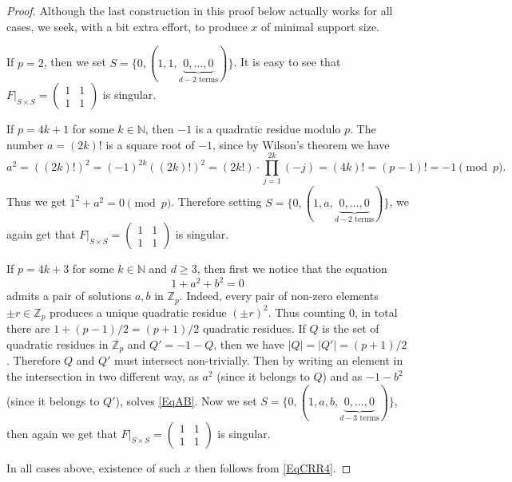 \documentclass[A4,11pt]{article}
\newcommand{\eval}[2]{\left.#1\right|_{#2}}
\begin{document}
\begin{proof}
Although the last construction in this proof below actually works for all cases, we seek, with a bit extra effort, to produce $x$ of minimal support size.

If $p=2$, then we set $S=\{0,(1,1,\underbrace{0,\ldots,0}_{d-2 \text{ terms}})\}$. It is easy to see that $\eval{F}{S\times S}=\begin{pmatrix} 1 & 1 \\ 1 & 1 \end{pmatrix}$ is singular.

If $p=4k+1$ for some $k\in\mathbb N$, then $-1$ is a quadratic residue modulo $p$. The number $a=(2k)!$ is a square root of $-1$, since by Wilson's theorem we have 
$$a^2=\left((2k)!\right)^2=(-1)^{2k}((2k)!)^2=(2k!)\cdot\prod_{j=1}^{2k}(-j)=(4k)!=(p-1)!=-1 \pmod p.$$
Thus we get $1^2+a^2=0\pmod p$. Therefore setting $S=\{0,(1,a,\underbrace{0,\ldots,0}_{d-2 \text{ terms}})\}$, we again get that $\eval{F}{S\times S}=\begin{pmatrix} 1 & 1 \\ 1 & 1 \end{pmatrix}$ is singular. 

If $p=4k+3$ for some $k\in\mathbb N$ and $d\ge 3$, then first we notice that the equation 
\begin{equation} \label{EqAB}
1+a^2+b^2=0
\end{equation} 
admits a pair of solutions $a,b$ in $\mathbb Z_p$. Indeed, every pair of non-zero elements $\pm r\in\mathbb Z_p$ produces a unique quadratic residue $(\pm r)^2$. Thus counting $0$, in total there are $1+(p-1)/2=(p+1)/2$ quadratic residues. If $Q$ is the set of quadratic residues in $\mathbb Z_p$ and $Q'=-1-Q$, then we have $|Q|=|Q'|=(p+1)/2$. Therefore $Q$ and $Q'$ must intersect non-trivially. Then by writing an element in the intersection in two different way, as $a^2$ (since it belongs to $Q$) and as $-1-b^2$ (since it belongs to $Q'$), solves \eqref{EqAB}. Now we set $S=\{0,(1,a,b,\underbrace{0,\ldots,0}_{d-3 \text{ terms}})\}$, then again we get that $\eval{F}{S\times S}=\begin{pmatrix} 1 & 1 \\ 1 & 1 \end{pmatrix}$ is singular.

In all cases above, existence of such $x$ then follows from \eqref{EqCRR4}.


\end{proof}
\end{document}
